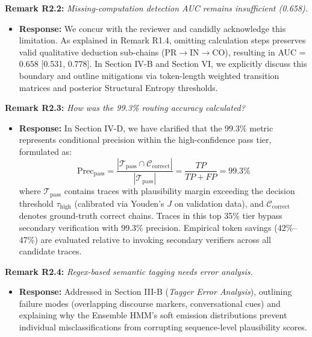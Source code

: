 \documentclass[11pt,a4paper]{article}
\begin{document}
\vspace{6pt}
\noindent\textbf{Remark R2.2:} \textit{Missing-computation detection AUC remains insufficient (0.658).}
\begin{itemize}[leftmargin=18pt]
    \item \textbf{Response:} We concur with the reviewer and candidly acknowledge this limitation. As explained in Remark R1.4, omitting calculation steps preserves valid qualitative deduction sub-chains ($\text{PR}\to\text{IN}\to\text{CO}$), resulting in AUC = $0.658$ [0.531, 0.778]. In Section IV-B and Section VI, we explicitly discuss this boundary and outline mitigations via token-length weighted transition matrices and posterior Structural Entropy thresholds.
\end{itemize}

\vspace{6pt}
\noindent\textbf{Remark R2.3:} \textit{How was the 99.3\% routing accuracy calculated?}
\begin{itemize}[leftmargin=18pt]
    \item \textbf{Response:} In Section IV-D, we have clarified that the 99.3\% metric represents conditional precision within the high-confidence pass tier, formulated as:
    \begin{equation}
    \text{Prec}_{\text{pass}} = \frac{|\mathcal{T}_{\text{pass}} \cap \mathcal{C}_{\text{correct}}|}{|\mathcal{T}_{\text{pass}}|} = \frac{TP}{TP + FP} = 99.3\%
    \end{equation}
    where $\mathcal{T}_{\text{pass}}$ contains traces with plausibility margin exceeding the decision threshold $\tau_{\text{high}}$ (calibrated via Youden's $J$ on validation data), and $\mathcal{C}_{\text{correct}}$ denotes ground-truth correct chains. Traces in this top 35\% tier bypass secondary verification with 99.3\% precision. Empirical token savings (42\%--47\%) are evaluated relative to invoking secondary verifiers across all candidate traces.
\end{itemize}

\vspace{6pt}
\noindent\textbf{Remark R2.4:} \textit{Regex-based semantic tagging needs error analysis.}
\begin{itemize}[leftmargin=18pt]
    \item \textbf{Response:} Addressed in Section III-B (\textit{Tagger Error Analysis}), outlining failure modes (overlapping discourse markers, conversational cues) and explaining why the Ensemble HMM's soft emission distributions prevent individual misclassifications from corrupting sequence-level plausibility scores.
\end{itemize}
\end{document}
